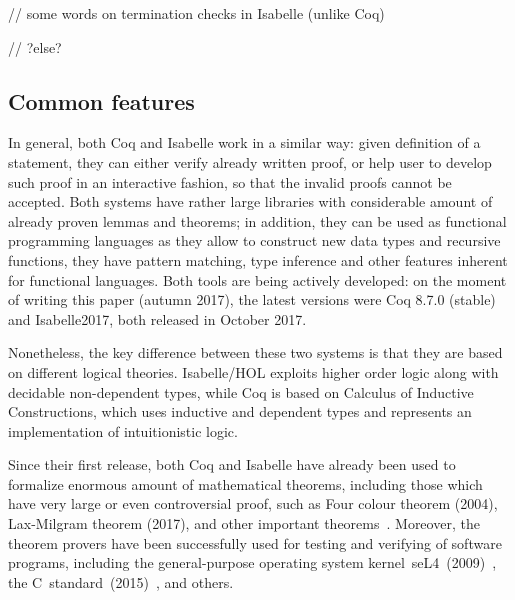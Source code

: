 \documentclass[article]{aaltoseries}
\begin{document}

// some words on termination checks in Isabelle (unlike Coq)

// ?else?



\subsection{Common features}

In general, both Coq and Isabelle work in a similar way: given definition of a statement, they can either verify already written proof, or help user to develop such proof in an interactive fashion, so that the invalid proofs cannot be accepted. Both systems have rather large libraries with considerable amount of already proven lemmas and theorems; in addition, they can be used as functional programming languages as they allow to construct new data types and recursive functions, they have pattern matching, type inference and other features inherent for functional languages. Both tools are being actively developed: on the moment of writing this paper (autumn 2017), the latest versions were Coq 8.7.0 (stable) and Isabelle2017, both released in October 2017.


Nonetheless, the key difference between these two systems is that they are based on different logical theories. Isabelle/HOL exploits higher order logic along with decidable non-dependent types, while Coq is based on Calculus of Inductive Constructions, which uses inductive and dependent types and represents an implementation of intuitionistic logic.


Since their first release, both Coq and Isabelle have already been used to formalize enormous amount of mathematical theorems, including those which have very large or even controversial proof, such as Four colour theorem (2004), Lax-Milgram theorem (2017), and other important theorems~\cite{Wiedijk100}. Moreover, the theorem provers have been successfully used for testing and verifying of software programs, including the general-purpose operating system kernel~seL4~(2009)~\cite{Klein09}, the C~standard~(2015)~\cite{Krebbers15}, and others.
\end{document}
